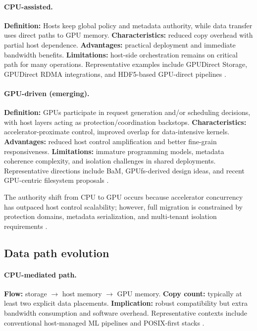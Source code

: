 \paragraph{CPU-assisted.}
\textbf{Definition:} Hosts keep global policy and metadata authority, while data transfer uses direct paths to GPU memory. \textbf{Characteristics:} reduced copy overhead with partial host dependence. \textbf{Advantages:} practical deployment and immediate bandwidth benefits. \textbf{Limitations:} host-side orchestration remains on critical path for many operations. Representative examples include GPUDirect Storage, GPUDirect RDMA integrations, and HDF5-based GPU-direct pipelines \cite{nvidia_gds_blog,nvidia_gds_overview,nvidia_gdrdma,hdf5gds2020}.

\paragraph{GPU-driven (emerging).}
\textbf{Definition:} GPUs participate in request generation and/or scheduling decisions, with host layers acting as protection/coordination backstops. \textbf{Characteristics:} accelerator-proximate control, improved overlap for data-intensive kernels. \textbf{Advantages:} reduced host control amplification and better fine-grain responsiveness. \textbf{Limitations:} immature programming models, metadata coherence complexity, and isolation challenges in shared deployments. Representative directions include BaM, GPUfs-derived design ideas, and recent GPU-centric filesystem proposals \cite{qureshi2023bam,silberstein2013gpufs,geminifs2025}.

The authority shift from CPU to GPU occurs because accelerator concurrency has outpaced host control scalability; however, full migration is constrained by protection domains, metadata serialization, and multi-tenant isolation requirements \cite{qureshi2023bam,zhang2025hpcstoragesurvey,liu2017rackscale}.

\subsection{Data path evolution}

\paragraph{CPU-mediated path.}
\textbf{Flow:} storage $\rightarrow$ host memory $\rightarrow$ GPU memory. \textbf{Copy count:} typically at least two explicit data placements. \textbf{Implication:} robust compatibility but extra bandwidth consumption and software overhead. Representative contexts include conventional host-managed ML pipelines and POSIX-first stacks \cite{murray2021tfdata,linux_io_uring}.

